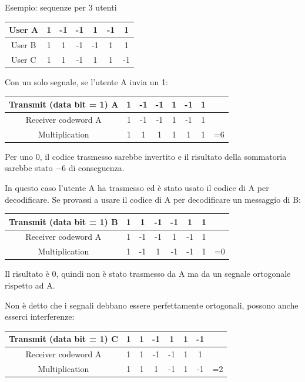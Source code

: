 Esempio: sequenze per 3 utenti
\begin{center}
	{
	\renewcommand{\arraystretch}{1.2}
	\begin{tabular}{|c|c|c|c|c|c|c|}
		\hline
		User A & 1 & -1 & -1 & 1 & -1 & 1 \\ 
		\hline
		User B & 1 & 1 & -1 & -1 & 1 & 1 \\ 
		\hline
		User C & 1 & 1 & -1 & 1 & 1 & -1 \\ 
		\hline
	\end{tabular}}
\end{center}

Con un solo segnale, se l'utente A invia un 1:
\begin{center}
	{
	\renewcommand{\arraystretch}{1.2}
	\begin{tabular}{|c|c|c|c|c|c|c|c|}
		\hline
		Transmit (data bit = 1) A & 1 & -1 & -1 & 1 & -1 & 1 & \\ 
		\hline
		Receiver codeword A & 1 & -1 & -1 & 1 & -1 & 1 & \\ 
		\hline
		Multiplication & 1 & 1 & 1 & 1 & 1 & 1 & =6 \\ 
		\hline
	\end{tabular}
	}
\end{center}

Per uno 0, il codice trasmesso sarebbe invertito e il risultato della sommatoria sarebbe stato $-6$ di conseguenza. 

In questo caso l'utente A ha trasmesso ed è stato usato il codice di A per decodificare. Se provassi a usare il codice di A per decodificare un messaggio di B:
\begin{center}
	{
	\renewcommand{\arraystretch}{1.2}
	\begin{tabular}{|c|c|c|c|c|c|c|c|}
		\hline
		Transmit (data bit = 1) B & 1 & 1 & -1 & -1 & 1 & 1 & \\ 
		\hline
		Receiver codeword A & 1 & -1 & -1 & 1 & -1 & 1 & \\ 
		\hline
		Multiplication & 1 & -1 & 1 & -1 & -1 & 1 & =0 \\ 
		\hline
	\end{tabular}
	}
\end{center}

Il risultato è 0, quindi non è stato trasmesso da A ma da un segnale ortogonale rispetto ad A. 

Non è detto che i segnali debbano essere perfettamente ortogonali, possono anche esserci interferenze: 
\begin{center}
	{
		\renewcommand{\arraystretch}{1.2}
		\begin{tabular}{|c|c|c|c|c|c|c|c|}
			\hline
			Transmit (data bit = 1) C & 1 & 1 & -1 & 1 & 1 & -1 & \\ 
			\hline
			Receiver codeword A 	 & 1 & 1 & -1 & -1 & 1 & 1 & \\ 
			\hline
			Multiplication 					  & 1 & 1 & 1 & -1 & 1 & -1 & =2 \\ 
			\hline
		\end{tabular}
	}
\end{center}


